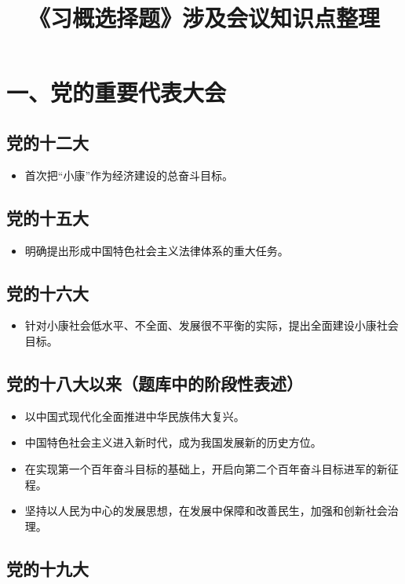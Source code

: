 \documentclass[12pt,a4paper]{ctexart}
\title{《习概选择题》涉及会议知识点整理}
\author{}
\date{}
\begin{document}
\section*{一、党的重要代表大会}

\subsection*{党的十二大}

\begin{itemize}
\item 首次把“小康”作为经济建设的总奋斗目标。
\end{itemize}

\subsection*{党的十五大}

\begin{itemize}
\item 明确提出形成中国特色社会主义法律体系的重大任务。
\end{itemize}

\subsection*{党的十六大}

\begin{itemize}
\item 针对小康社会低水平、不全面、发展很不平衡的实际，提出全面建设小康社会目标。
\end{itemize}

\subsection*{党的十八大以来（题库中的阶段性表述）}

\begin{itemize}
\item 以中国式现代化全面推进中华民族伟大复兴。
\item 中国特色社会主义进入新时代，成为我国发展新的历史方位。
\item 在实现第一个百年奋斗目标的基础上，开启向第二个百年奋斗目标进军的新征程。
\item 坚持以人民为中心的发展思想，在发展中保障和改善民生，加强和创新社会治理。
\end{itemize}

\subsection*{党的十九大}
\end{document}
